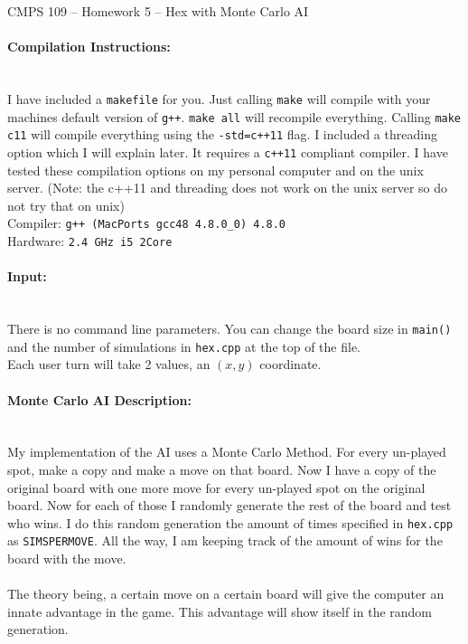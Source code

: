 \documentclass[11pt]{article}
\begin{document}
\begin{center}
	CMPS 109 -- Homework 5 -- Hex with Monte Carlo AI
\end{center}

\paragraph{Compilation Instructions: } \hspace{0pt} \\
	I have included a \texttt{makefile} for you. Just calling \texttt{make} will 
	compile with your machines default version of \texttt{g++}. \texttt{make all}
	will recompile everything. Calling \texttt{make c11}
	will compile everything using the \texttt{-std=c++11} flag. I included a
	threading option which I will explain later. It requires a \texttt{c++11} compliant compiler. I have
	tested these compilation options on my personal computer and on the unix server.
	(Note: the c++11 and threading does not work on the unix server so do not try that on unix) \\
	Compiler: \texttt{g++ (MacPorts gcc48 4.8.0\_0) 4.8.0} \\
	Hardware: \texttt{2.4 GHz i5 2Core}

\paragraph{Input: } \hspace{0pt} \\
	There is no command line parameters. You can change the board size in \texttt{main()}
	and the number of simulations in \texttt{hex.cpp} at the top of the file. \\
	Each user turn will take 2 values, an $(x,y)$ coordinate.
	
\paragraph{Monte Carlo AI Description: } \hspace{0pt} \\
	 My implementation of the AI uses a Monte Carlo Method. For every un-played spot,
	  make a copy and make a move on that board. Now I have a copy 
	 of the original board with one more move for every un-played spot on the original board.
	 Now for each of those I randomly generate the rest of the board and test who wins. I do this
	 random generation the amount of times specified in \texttt{hex.cpp} as \texttt{SIMSPERMOVE}.
	 All the way, I am keeping track of the amount of wins for the board with the move. \\\\
	 The theory being, a certain move on a certain board will give the computer an innate advantage 
	 in the game. This advantage will show itself in the random generation.
	 
\end{document}
